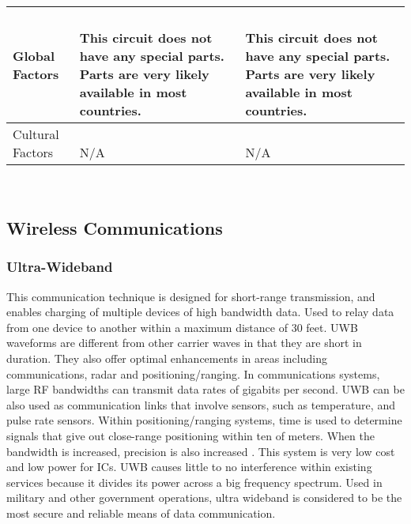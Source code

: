 \documentclass[12pt]{article}
\begin{document}
\begin{table}[h!]
\begin{tabular}{| l | l | l |}
\parbox{0.17\linewidth}{\raggedleft Global Factors} & 
\parbox{0.240\linewidth}{\hfill \\
This circuit does not have any special parts. Parts are very likely available in most countries.
\\} & \parbox{0.240\linewidth}{\hfill \\
This circuit does not have any special parts. Parts are very likely available in most countries.
\\}\\ \hline
\parbox{0.17\linewidth}{\raggedleft Cultural Factors} & 
\parbox{0.240\linewidth}{\hfill \\
N/A
\\} & \parbox{0.240\linewidth}{\hfill \\
N/A
\\}\\ \hline
\end{tabular}
\end{table}
\hfill \\
\pagebreak

\subsection{Wireless Communications}
\subsubsection{Ultra-Wideband}
This communication technique is designed for short-range transmission, and enables charging of multiple devices of high bandwidth data. Used to relay data from one device to another within a maximum distance of 30 feet. UWB waveforms are different from other carrier waves in that they are short in duration. They also offer optimal enhancements in areas including communications, radar and positioning/ranging. In communications systems, large RF bandwidths can transmit data rates of gigabits per second. UWB can be also used as communication links that involve sensors, such as temperature, and pulse rate sensors. Within positioning/ranging systems, time is used to determine signals that give out close-range positioning within ten of meters. When the bandwidth is increased, precision is also increased \cite{ieeeuwb}. This system is very low cost and low power for ICs. UWB causes little to no interference within existing services because it divides its power across a big frequency spectrum. Used in military and other government operations, ultra wideband is considered to be the most secure and reliable means of data communication. \cite{widebandreg}\\
\end{document}
